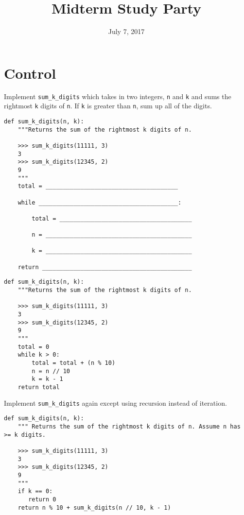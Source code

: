 \documentclass{exam}
\title{Midterm Study Party}
\date{July 7, 2017}
\begin{document}
\maketitle

\section{Control}
\begin{questions}
\question Implement \lstinline$sum_k_digits$ which takes in two integers, \lstinline$n$ and \lstinline$k$ and sums the rightmost \lstinline$k$ digits of \lstinline$n$. If \lstinline$k$ is greater than \lstinline$n$, sum up all of the digits. 

\ifprintanswers\else
\begin{lstlisting}
def sum_k_digits(n, k):
    """Returns the sum of the rightmost k digits of n.

    >>> sum_k_digits(11111, 3)
    3
    >>> sum_k_digits(12345, 2)
    9
    """
    total = ______________________________________
    
    while ________________________________________:
    
        total = ______________________________________
        
        n = __________________________________________
        
        k = __________________________________________
    	
    return ___________________________________________
\end{lstlisting}
\fi

\begin{solution}
\begin{lstlisting}
def sum_k_digits(n, k):
    """Returns the sum of the rightmost k digits of n.
    
    >>> sum_k_digits(11111, 3)
    3
    >>> sum_k_digits(12345, 2)
    9
    """
    total = 0
    while k > 0:
        total = total + (n % 10)
        n = n // 10
        k = k - 1
    return total
\end{lstlisting}
\end{solution}

\question Implement \lstinline$sum_k_digits$ again except using recursion instead of iteration.

\begin{solution}
\begin{lstlisting}
def sum_k_digits(n, k):
	""" Returns the sum of the rightmost k digits of n. Assume n has >= k digits.

    >>> sum_k_digits(11111, 3)
    3
    >>> sum_k_digits(12345, 2)
    9
	"""
	if k == 0:
	   return 0
	return n % 10 + sum_k_digits(n // 10, k - 1)
\end{lstlisting}
\end{solution}
\end{questions}
\clearpage
\end{document}
